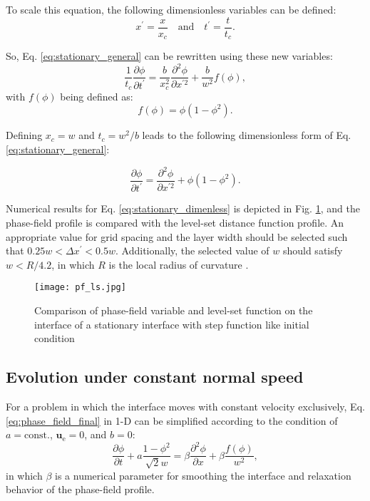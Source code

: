 To scale this equation, the following dimensionless variables can be defined:
\begin{equation} \label{eq:dimenless_variables}
x^\prime = \frac{x}{x_c} \quad \text{and} \quad t^\prime = \frac{t}{t_c}.
\end{equation}

So, Eq. \ref{eq:stationary_general} can be rewritten using these new variables:
\begin{equation}
\frac{1}{t_{c}} \frac{\partial \phi}{\partial t^{\prime}}=\frac{b}{x_{c}^{2}} \frac{\partial^{2} \phi}{\partial x^{\prime 2}}+\frac{b}{w^{2}} f(\phi),
\end{equation}
with $f(\phi)$ being defined as:
\begin{equation}
f(\phi)=\phi\left(1-\phi^{2}\right).
\end{equation}

Defining $x_c = w$ and $t_c=w^2/b$ leads to the following dimensionless form of Eq. \ref{eq:stationary_general}:

\begin{equation} \label{eq:stationary_dimenless}
\frac{\partial \phi}{\partial t^{\prime}}=\frac{\partial^{2} \phi}{\partial x^{\prime 2}}+\phi\left(1-\phi^{2}\right).
\end{equation}

Numerical results for Eq. \ref{eq:stationary_dimenless} is depicted in Fig.  \ref{fig:fig:pf_ls}, and the phase-field profile is compared with the level-set distance function profile. An appropriate value for grid spacing and the layer width should be selected such that $0.25 w < \Delta x^\prime < 0.5 w $. Additionally, the selected value of $w$ should satisfy $w < R/4.2$, in which $R$ is the local radius of curvature \cite{Sun2007}.

\begin{figure}
\centering
\medskip
\texttt{[image: pf\_ls.jpg]}
\caption[Comparison of phase-field variable and level-set function]{Comparison of phase-field variable and level-set function on the interface of a stationary interface with step function like initial condition \cite{Sun2007}}
\label{fig:fig:pf_ls}
\end{figure}


\subsection{Evolution under constant normal speed}

For a problem in which the interface moves with constant velocity exclusively, Eq. \ref{eq:phase_field_final} in 1-D can be simplified according to the condition of $a=\text{const.}$, $\boldsymbol{u}_{\mathrm{e}}=0$, and $b=0$:
\begin{equation}
\frac{\partial \phi}{\partial t}+a \frac{1-\phi^{2}}{\sqrt{2} w}=\beta \frac{\partial^{2} \phi}{\partial x} + \beta\frac{f(\phi)}{w^{2}},
\end{equation}
in which $\beta$ is a numerical parameter for smoothing the interface and relaxation behavior of the phase-field profile.

